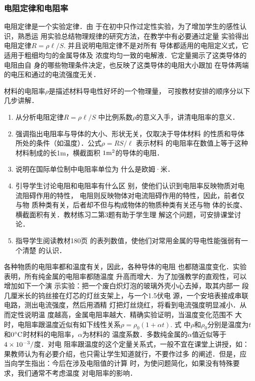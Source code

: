 \subsubsection{电阻定律和电阻率}

电阻定律是一个实验定律．由
于在初中只作过定性实验，为了增加学生的感性认识，熟悉运
用实验总结物理规律的研究方法，在教学中有必要通过定量
实验得出电阻定律$R=\rho\ell/S$.
并且说明电阻定律不是对所有
导体都适用的电阻定义式，它适用于粗细均匀的金属导体及
浓度均匀一致的电解液．它定量揭示了这类导体的电阻由自
身的哪些物理条件决定，也反映了这类导体的电阻大小跟加
在导体两端的电压和通过的电流强度无关．

材料的电阻率$\rho$是描述材料导电性好坏的一个物理量，
可按教材安排的顺序分以下几步讲解．
\begin{enumerate}
\item 从分析电阻定律$R=\rho\ell/S$
中比例系数$\rho$的意义入手，讲清电阻率的意义．
\item 
强调指出电阻率与导体的大小、形状无关，仅取决于导体材料
的性质和导体所处的条件（如温度）．公式$\rho=RS/\ell$
表示材料
的电阻率在数值上等于这种材料制成的长1m，横截面积
$1{\rm m^2}$的导体的电阻．
\item 说明在国际单位制中电阻率单位为
什么是欧姆·米．
\item 引导学生讨论电阻和电阻率有什么区
别，使他们认识到电阻率反映物质对电流阻碍作用的特性，
电阻则反映物体对电流阻碍作用的特性，因此，前者仅与物
质种类有关，后者却不但与构成物体的物质种类有关还与物
体的长度、横截面积有关．教材练习二第3题有助于学生理
解这个问题，可安排课堂讨论．
\item 指导学生阅读教材180页
的表列数值，使他们对常用金属的导电性能强弱有一个清楚
的认识．
\end{enumerate}

各种物质的电阻率都和温度有关，因此，各种导体的电阻
也都随温度变化．实验表明，所有纯金属的电阻率都随温度
升高而增大．为了加强教学的直观性，可以增加如下一个演
示实验：把一个废白炽灯泡的玻璃外壳小心去掉，取其内部一
段几厘米长的钨丝接在灯芯的灯丝支架上，与一个1.5伏电
源，一个安培表接成串联电路，测出电流强度，然后用酒精
灯把灯丝烧红，将看到电流强度明显减小．从而定性说明温
度越高，金属电阻率越大．精确实验证明，当温度变化范围不
大时，电阻率跟温度近似有如下线性关系$\rho=\rho_0(1+\alpha t)$. 式
中$\rho$和$\rho_0$分别是温度为$t$和$0^{\circ}{\rm C}$时材料的电阻率，$\alpha$为材料的
温度系数．多数纯金属的$\alpha$值近似等于$4\times10^{-3}/$度．对电
阻率跟温度的这个定量关系式，一般不宜在课堂上讲授，如：
果教师认为有必要介绍，也只需让学生知道就行，不要作过多
的阐述．但是，应当向学生指出：今后在涉及电阻值的计算
时，为使问题简化，如果没有特殊要求，我们通常不考虑温度
对电阻率的影响．

